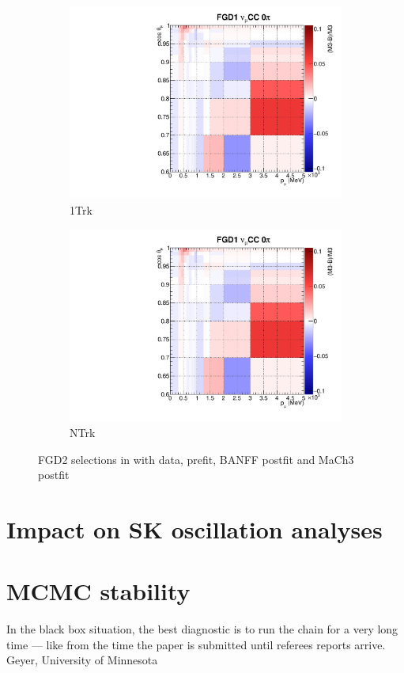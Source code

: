 \begin{figure}
\begin{subfigure}[t]{0.24\textwidth}
		\includegraphics[width=\textwidth, trim={0mm 0mm 10mm 7mm}, clip, page=39]{figures/mach3/banff/postfit_comp}
		\caption{\numu 1Trk}
	\end{subfigure}
	\begin{subfigure}[t]{0.24\textwidth}
		\includegraphics[width=\textwidth, trim={0mm 0mm 10mm 7mm}, clip, page=42]{figures/mach3/banff/postfit_comp}
		\caption{\numu NTrk}
	\end{subfigure}
	\caption{FGD2 selections in \pmu with data, prefit, BANFF postfit and MaCh3 postfit}
	\label{fig:mach3_banff_postfit_fgd2}
\end{figure}

\section{Impact on SK oscillation analyses}

\section{MCMC stability}
In the black box situation, the best diagnostic is to run the chain
for a very long time — like from the time the paper is submitted
until referees reports arrive. Geyer, University of Minnesota

\clearpage